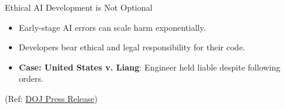 \documentclass[aspectratio=169]{beamer}
\begin{document}
\begin{frame}{Ethical AI Development is Not Optional}
\begin{itemize}
\item Early-stage AI errors can scale harm exponentially.
\item Developers bear ethical and legal responsibility for their code.
\item \textbf{Case: United States v. Liang}: Engineer held liable despite following orders.
\end{itemize}

\footnotesize (Ref: \href{https://www.justice.gov/opa/pr/volkswagen-engineer-pleads-guilty-his-role-conspiracy-cheat-us-emissions-tests}{DOJ Press Release})
\end{frame}
\end{document}
